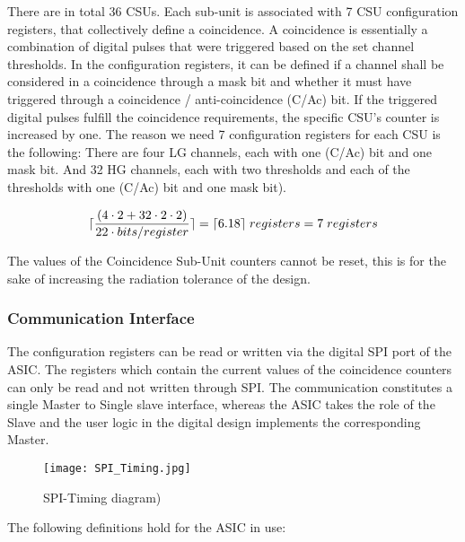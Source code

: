 There are in total 36 CSUs. Each sub-unit is associated with 7 CSU configuration registers, that collectively define a coincidence. A coincidence is essentially a combination of digital pulses that were triggered based on the set channel thresholds. In the configuration registers, it can be defined if a channel shall be considered in a coincidence through a mask bit and whether it must have triggered through a coincidence / anti-coincidence (C/Ac) bit. If the triggered digital pulses fulfill the coincidence requirements, the specific CSU’s counter is increased by one. The reason we need 7 configuration registers for each CSU is the following: 
\newline
There are four LG channels, each with one (C/Ac) bit and one mask bit. And 32 HG channels, each with two thresholds and each of the thresholds with one (C/Ac) bit and one mask bit).

\begin{equation}
\lceil{\frac{\left(4\cdot2 + 32 \cdot 2 \cdot 2 \right)}{22\cdot bits/register}}\rceil = \lceil{6.18}\rceil \hphantom{\cdot}  registers = 7 \hphantom{\cdot} registers
\end{equation}

The values of the Coincidence Sub-Unit counters cannot be reset, this is for the sake of increasing the radiation tolerance of the design.

\subsubsection{Communication Interface}

The configuration registers can be read or written via the digital SPI port of the ASIC. The registers which contain the current values of the coincidence counters can only be read and not written through SPI. The communication constitutes a single Master to Single slave interface, whereas the ASIC takes the role of the Slave and the user logic in the digital design implements the corresponding Master.

\begin{figure}[H]
    \centering
    \texttt{[image: SPI\_Timing.jpg]}
    \caption[]{SPI-Timing diagram) }
    \label{fig:SPI_Timing}
\end{figure}

The following definitions hold for the ASIC in use:


